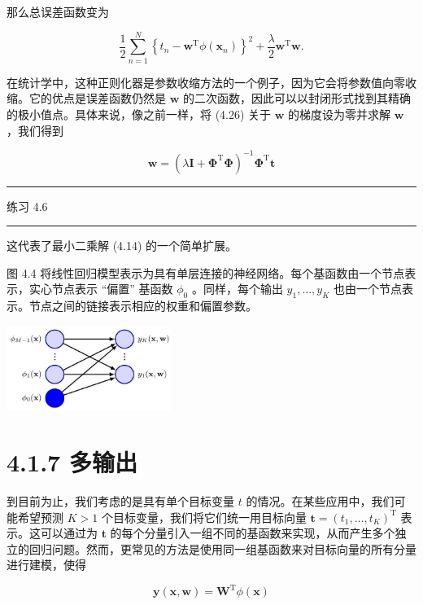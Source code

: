 \documentclass[10pt]{article}
\newcommand{\HRule}{\begin{center}\rule{0.9\linewidth}{0.2mm}\end{center}}
\begin{document}
那么总误差函数变为

\[
\frac{1}{2}\mathop{\sum }\limits_{{n = 1}}^{N}{\left\{  {t}_{n} - {\mathbf{w}}^{\mathrm{T}}\phi \left( {\mathbf{x}}_{n}\right) \right\}  }^{2} + \frac{\lambda }{2}{\mathbf{w}}^{\mathrm{T}}\mathbf{w}. \tag{4.26}
\]

在统计学中，这种正则化器是参数收缩方法的一个例子，因为它会将参数值向零收缩。它的优点是误差函数仍然是 \(\mathbf{w}\) 的二次函数，因此可以以封闭形式找到其精确的极小值点。具体来说，像之前一样，将 (4.26) 关于 \(\mathbf{w}\) 的梯度设为零并求解 \(\mathbf{w}\) ，我们得到

\[
\mathbf{w} = {\left( \lambda \mathbf{I} + {\mathbf{\Phi }}^{\mathrm{T}}\mathbf{\Phi }\right) }^{-1}{\mathbf{\Phi }}^{\mathrm{T}}\mathbf{t} \tag{4.27}
\]

\HRule

练习 4.6

\HRule

这代表了最小二乘解 (4.14) 的一个简单扩展。

图 4.4 将线性回归模型表示为具有单层连接的神经网络。每个基函数由一个节点表示，实心节点表示 “偏置” 基函数 \({\phi }_{0}\) 。同样，每个输出 \({y}_{1},\ldots ,{y}_{K}\) 也由一个节点表示。节点之间的链接表示相应的权重和偏置参数。

\begin{center}
\includegraphics[max width=0.4\textwidth]{images/0194e279-9b28-703a-88f4-c3ac21e2010d_138_972_344_567_294_0.jpg}
\end{center}
\hspace*{3em} 

\section*{4.1.7 多输出}

到目前为止，我们考虑的是具有单个目标变量 \(t\) 的情况。在某些应用中，我们可能希望预测 \(K > 1\) 个目标变量，我们将它们统一用目标向量 \(\mathbf{t} = {\left( {t}_{1},\ldots ,{t}_{K}\right) }^{\mathrm{T}}\) 表示。这可以通过为 \(\mathbf{t}\) 的每个分量引入一组不同的基函数来实现，从而产生多个独立的回归问题。然而，更常见的方法是使用同一组基函数来对目标向量的所有分量进行建模，使得

\[
\mathbf{y}\left( {\mathbf{x},\mathbf{w}}\right)  = {\mathbf{W}}^{\mathrm{T}}\phi \left( \mathbf{x}\right)  \tag{4.28}
\]
\end{document}
